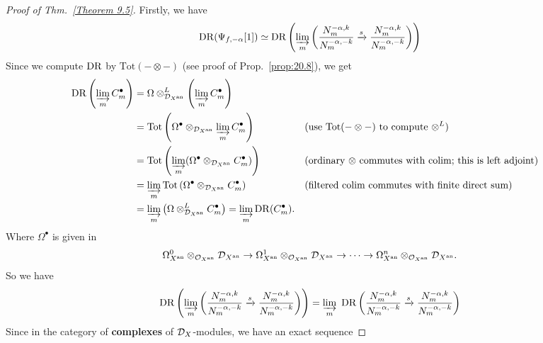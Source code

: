 \begin{proof}[Proof of Thm.~\ref{Theorem 9.5}]
    Firstly, we have
    \[
        \mathrm{DR}(\Psi_{f,-\alpha}[1]) \simeq \mathrm{DR}\left( \varinjlim_m  \left( \frac{N_m^{-\alpha,k}}{N_m^{-\alpha,-k}} \xrightarrow{s} \frac{N_m^{-\alpha,k}}{N_m^{-\alpha,-k}} \right) \right)
    \]
    Since we compute $\mathrm{DR}$ by $\mathrm{Tot}(-\otimes -)$ (see proof of Prop.~\ref{prop:20.8}), we get
    \begin{align*}
        \mathrm{DR}\left(\varinjlim_m C_m^\bullet\right) & = \Omega \otimes^L_{\mathcal{D}_{X^\mathrm{an}}}\left(\varinjlim_m C_m^\bullet\right)                                                                                                                                 \\
                                                         & = \mathrm{Tot}\left(\Omega^\bullet\otimes_{\mathcal{D}_{X^\mathrm{an}}}\varinjlim_m C_m^\bullet\right)                          &  & (\text{use $\mathrm{Tot}(-\otimes -)$ to compute }\otimes^L)                     \\
                                                         & = \mathrm{Tot}\left(\varinjlim_m (\Omega^\bullet\otimes_{\mathcal{D}_{X^\mathrm{an}}} C_m^\bullet)\right)                       &  & (\text{ordinary $\otimes$ commutes with $\mathrm{colim}$; this is left adjoint}) \\
                                                         & = \varinjlim_m \mathrm{Tot}\left(\Omega^\bullet\otimes_{\mathcal{D}_{X^\mathrm{an}}} C_m^\bullet\right)                         &  & (\text{filtered colim commutes with finite direct sum})                          \\
                                                         & = \varinjlim_m \left(\Omega \otimes^L_{\mathcal{D}_{X^\mathrm{an}}} C_m^\bullet\right) = \varinjlim_m \mathrm{DR}(C_m^\bullet).
    \end{align*}
    Where $\Omega^\bullet$ is given in \cite[Sect.~4.2 and 4.7]{hotta2008d}
    \[
        \Omega^0_{X^\mathrm{an}}\otimes_{\mathcal O_{X^\mathrm{an}}}\mathcal{D}_{X^\mathrm{an}} \to \Omega^1_{X^\mathrm{an}}\otimes_{\mathcal O_{X^\mathrm{an}}}\mathcal{D}_{X^\mathrm{an}} \to \dots \to \Omega^n_{X^\mathrm{an}}\otimes_{\mathcal O_{X^\mathrm{an}}}\mathcal{D}_{X^\mathrm{an}}.
    \]
    So we have
    \[
        \mathrm{DR}\left( \varinjlim_m  \left( \frac{N_m^{-\alpha,k}}{N_m^{-\alpha,-k}} \xrightarrow{s} \frac{N_m^{-\alpha,k}}{N_m^{-\alpha,-k}} \right) \right) = \varinjlim_m\  \mathrm{DR}\left( \frac{N_m^{-\alpha,k}}{N_m^{-\alpha,-k}} \xrightarrow{s} \frac{N_m^{-\alpha,k}}{N_m^{-\alpha,-k}} \right)
    \]
    Since in the category of \textbf{complexes} of $\mathcal{D}_X$-modules, we have an exact sequence

\end{proof}
